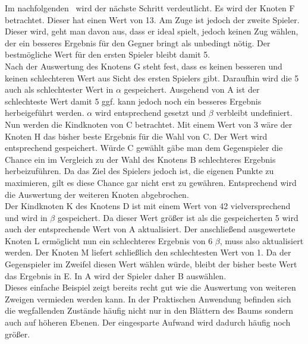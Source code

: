 Im nachfolgenden \gtree\ wird der nächste Schritt verdeutlicht. Es wird der Knoten F betrachtet. Dieser hat einen Wert von 13. Am Zuge ist jedoch der zweite Spieler. Dieser wird, geht man davon aus, dass er ideal spielt, jedoch keinen Zug wählen, der ein besseres Ergebnis für den Gegner bringt als unbedingt nötig. Der bestmögliche Wert für den ersten Spieler bleibt damit 5.
\\Nach der Auswertung des Knotens G steht fest, dass es keinen besseren und keinen schlechteren Wert aus Sicht des ersten Spielers gibt. Daraufhin wird die 5 auch als schlechtester Wert in $\alpha$ gespeichert. Ausgehend von A  ist der schlechteste Wert damit 5 ggf. kann jedoch noch ein besseres Ergebnis herbeigeführt werden. $\alpha$ wird entsprechend gesetzt und $\beta$ verbleibt undefiniert.\\
Nun werden die Kindknoten von C betrachtet. Mit einem Wert von 3 wäre der Knoten H das bisher beste Ergebnis für die Wahl von C. Der Wert wird entsprechend gespeichert. Würde C gewählt gäbe man dem Gegenspieler die Chance ein im Vergleich zu der Wahl des Knotens B schlechteres Ergebnis herbeizuführen. Da das Ziel des Spielers jedoch ist, die eigenen Punkte zu maximieren, gilt es diese Chance gar nicht erst zu gewähren. Entsprechend wird die Auswertung der weiteren Knoten abgebrochen.\\
Der Kindknoten K des Knotens D ist mit einem Wert von 42 vielversprechend und wird in $\beta$ gespeichert. Da dieser Wert größer ist als die gespeicherten 5 wird auch der entsprechende Wert von A aktualisiert. Der anschließend ausgewertete Knoten L ermöglicht nun ein schlechteres Ergebnis von 6 $\beta$, muss also aktualisiert werden. Der Knoten M liefert schließlich den schlechtesten Wert von 1. Da der Gegenspieler im Zweifel diesen Wert wählen würde, bleibt der bisher beste Wert das Ergebnis in E. In A wird der Spieler daher B auswählen.
\vspace{0.5cm}\\ 
Dieses einfache Beispiel zeigt bereits recht gut wie die Auswertung von weiteren Zweigen vermieden werden kann. In der Praktischen Anwendung befinden sich die wegfallenden Zustände häufig nicht nur in den Blättern des Baums sondern auch auf höheren Ebenen. Der eingesparte Aufwand wird dadurch häufig noch größer.  

